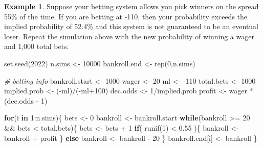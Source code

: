 \documentclass[
  11pt,
]{book}
\newenvironment{Shaded}{\begin{snugshade}}{\end{snugshade}}
\newcommand{\CommentTok}[1]{\textcolor[rgb]{0.56,0.35,0.01}{\textit{#1}}}
\newcommand{\ControlFlowTok}[1]{\textcolor[rgb]{0.13,0.29,0.53}{\textbf{#1}}}
\newcommand{\DecValTok}[1]{\textcolor[rgb]{0.00,0.00,0.81}{#1}}
\newcommand{\FloatTok}[1]{\textcolor[rgb]{0.00,0.00,0.81}{#1}}
\newcommand{\FunctionTok}[1]{\textcolor[rgb]{0.00,0.00,0.00}{#1}}
\newcommand{\NormalTok}[1]{#1}
\newcommand{\OtherTok}[1]{\textcolor[rgb]{0.56,0.35,0.01}{#1}}
\newcommand{\SpecialCharTok}[1]{\textcolor[rgb]{0.00,0.00,0.00}{#1}}
\theoremstyle{definition}
\theoremstyle{definition}
\newtheorem{example}{Example}[chapter]
\theoremstyle{definition}
\theoremstyle{definition}
\theoremstyle{remark}
\begin{document}
\begin{example}
Suppose your betting system allows you pick winners on the spread 55\% of the time. If you are betting at -110, then your probability exceeds the implied probability of 52.4\% and this system is not guaranteed to be an eventual loser. Repeat the simulation above with the new probability of winning a wager and 1,000 total bets.
\end{example}

\begin{Shaded}
\begin{Highlighting}[]
\FunctionTok{set.seed}\NormalTok{(}\DecValTok{2022}\NormalTok{)}
\NormalTok{n.sims }\OtherTok{\textless{}{-}} \DecValTok{10000}
\NormalTok{bankroll.end }\OtherTok{\textless{}{-}} \FunctionTok{rep}\NormalTok{(}\DecValTok{0}\NormalTok{,n.sims)}

\CommentTok{\# betting info}
\NormalTok{bankroll.start }\OtherTok{\textless{}{-}} \DecValTok{1000}
\NormalTok{wager }\OtherTok{\textless{}{-}} \DecValTok{20}
\NormalTok{ml }\OtherTok{\textless{}{-}} \SpecialCharTok{{-}}\DecValTok{110}
\NormalTok{total.bets }\OtherTok{\textless{}{-}} \DecValTok{1000}
\NormalTok{implied.prob }\OtherTok{\textless{}{-}}\NormalTok{ (}\SpecialCharTok{{-}}\NormalTok{ml)}\SpecialCharTok{/}\NormalTok{(}\SpecialCharTok{{-}}\NormalTok{ml}\SpecialCharTok{+}\DecValTok{100}\NormalTok{)}
\NormalTok{dec.odds }\OtherTok{\textless{}{-}} \DecValTok{1}\SpecialCharTok{/}\NormalTok{implied.prob}
\NormalTok{profit }\OtherTok{\textless{}{-}}\NormalTok{ wager }\SpecialCharTok{*}\NormalTok{ (dec.odds }\SpecialCharTok{{-}} \DecValTok{1}\NormalTok{)}

\ControlFlowTok{for}\NormalTok{(i }\ControlFlowTok{in} \DecValTok{1}\SpecialCharTok{:}\NormalTok{n.sims)\{}
\NormalTok{  bets }\OtherTok{\textless{}{-}} \DecValTok{0}
\NormalTok{  bankroll }\OtherTok{\textless{}{-}}\NormalTok{ bankroll.start}
  \ControlFlowTok{while}\NormalTok{(bankroll }\SpecialCharTok{\textgreater{}=} \DecValTok{20} \SpecialCharTok{\&\&}\NormalTok{ bets }\SpecialCharTok{\textless{}}\NormalTok{ total.bets)\{}
\NormalTok{    bets }\OtherTok{\textless{}{-}}\NormalTok{ bets }\SpecialCharTok{+} \DecValTok{1}
    \ControlFlowTok{if}\NormalTok{( }\FunctionTok{runif}\NormalTok{(}\DecValTok{1}\NormalTok{) }\SpecialCharTok{\textless{}} \FloatTok{0.55}\NormalTok{ )\{}
\NormalTok{      bankroll }\OtherTok{\textless{}{-}}\NormalTok{ bankroll }\SpecialCharTok{+}\NormalTok{ profit}
\NormalTok{    \} }\ControlFlowTok{else}
\NormalTok{      bankroll }\OtherTok{\textless{}{-}}\NormalTok{ bankroll }\SpecialCharTok{{-}} \DecValTok{20}
\NormalTok{  \}}
\NormalTok{  bankroll.end[i] }\OtherTok{\textless{}{-}}\NormalTok{ bankroll}
\NormalTok{\}}


\end{Highlighting}
\end{Shaded}
\end{document}
